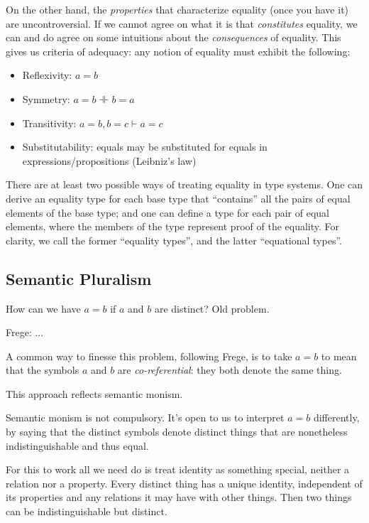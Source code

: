 \documentclass{article}
\begin{document}
On the other hand, the \textit{properties} that characterize equality
(once you have it) are uncontroversial. If we cannot agree on what it
is that \textit{constitutes} equality, we can and do agree on some
intuitions about the \textit{consequences} of equality. This gives us
criteria of adequacy: any notion of equality must exhibit the
following:

\begin{itemize}
\item Reflexivity: \(a=b\)
\item Symmetry: \(a=b \dashVdash b=a\)
\item Transitivity: \(a=b, b=c \vdash a=c\)
\item Substitutability: equals may be substituted for equals in
  expressions/propositions (Leibniz's law)
\end{itemize}


There are at least two possible ways of treating equality in type
systems. One can derive an equality type for each base type that
``contains'' all the pairs of equal elements of the base type; and one
can define a type for each pair of equal elements, where the members
of the type represent proof of the equality. For clarity, we call the
former ``equality types'', and the latter ``equational types''.

\subsection{Semantic Pluralism}

How can we have \(a=b\) if \(a\) and \(b\) are distinct?  Old problem.

Frege: ...

A common way to finesse this problem, following Frege, is to take
\(a=b\) to mean that the symbols \(a\) and \(b\) are
\textit{co-referential}: they both denote the same thing.

This approach reflects semantic monism.

Semantic monism is not compulsory. It's open to us to interpret
\(a=b\) differently, by saying that the distinct symbols denote
distinct things that are nonetheless indistinguishable and thus equal.

For this to work all we need do is treat identity as something
special, neither a relation nor a property. Every distinct thing has a
unique identity, independent of its properties and any relations it
may have with other things. Then two things can be indistinguishable
but distinct.
\end{document}
